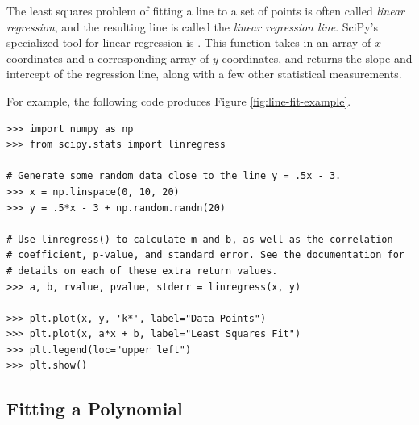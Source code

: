 \begin{info} %
The least squares problem of fitting a line to a set of points is often called \emph{linear regression}, and the resulting line is called the \emph{linear regression line}.
SciPy's specialized tool for linear regression is .
This function takes in an array of $x$-coordinates and a corresponding array of $y$-coordinates, and returns the slope and intercept of the regression line, along with a few other statistical measurements.

For example, the following code produces Figure \ref{fig:line-fit-example}.

\begin{lstlisting}
>>> import numpy as np
>>> from scipy.stats import linregress

# Generate some random data close to the line y = .5x - 3.
>>> x = np.linspace(0, 10, 20)
>>> y = .5*x - 3 + np.random.randn(20)

# Use linregress() to calculate m and b, as well as the correlation
# coefficient, p-value, and standard error. See the documentation for
# details on each of these extra return values.
>>> a, b, rvalue, pvalue, stderr = linregress(x, y)

>>> plt.plot(x, y, 'k*', label="Data Points")
>>> plt.plot(x, a*x + b, label="Least Squares Fit")
>>> plt.legend(loc="upper left")
>>> plt.show()
\end{lstlisting}
\end{info}

\subsection*{Fitting a Polynomial} %

